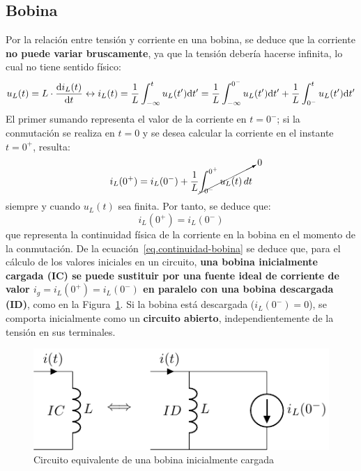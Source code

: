 	\subsection{Bobina}
	Por la relación entre tensión y corriente en una bobina, se deduce que la corriente \textbf{no puede variar bruscamente}, ya que la tensión debería hacerse infinita, lo cual no tiene sentido físico:
	\begin{equation*}
		u_L(t) = L \cdot \diff{i_L(t)}{t}
\leftrightarrow
i_L(t) = \frac{1}{L} \int^t_{-\infty}u_L(t') \mathrm{d}t'= \frac{1}{L} \int^{0^-}_{-\infty}u_L(t')\mathrm{d}t' + \frac{1}{L} \int^{t}_{0^-}u_L(t')\mathrm{d}t'
	\end{equation*}
	El primer sumando representa el valor de la corriente en $t=0^-$; si la conmutación se realiza en $t=0$ y se desea calcular la corriente en el instante $t=0^+$, resulta:
	\begin{equation*}
		i_L(0^+)=i_L(0^-)+ \dfrac{1}{L}\cancelto{0}{\int_{0^-}^{0^+} u_L(t)\, dt}
	\end{equation*}
	siempre y cuando $u_L(t)$ sea finita. Por tanto, se deduce que:
	\begin{equation}\label{eq.continuidad-bobina}
		\boxed{i_L(0^+)=i_L(0^-)}
	\end{equation}
	que representa la continuidad física de la corriente en la bobina en el momento de la conmutación. De la ecuación~\eqref{eq.continuidad-bobina} se deduce que, para el cálculo de los valores iniciales en un circuito, \textbf{una bobina inicialmente cargada (IC) se puede sustituir por una fuente ideal de corriente de valor $i_g=i_L(0^+)=i_L(0^-)$ en paralelo con una bobina descargada (ID)}, como en la Figura~\ref{fig.condiciones_iniciales_L}. Si la bobina está descargada ($i_L(0^-)=0$), se comporta inicialmente como un \textbf{circuito abierto}, independientemente de la tensión en sus terminales.
	\begin{figure}[H]
	    \centering
	    \includegraphics{../figs/condiciones_iniciales_L.pdf}
	    \caption{Circuito equivalente de una bobina inicialmente cargada}
	    \label{fig.condiciones_iniciales_L}
	\end{figure}
	
